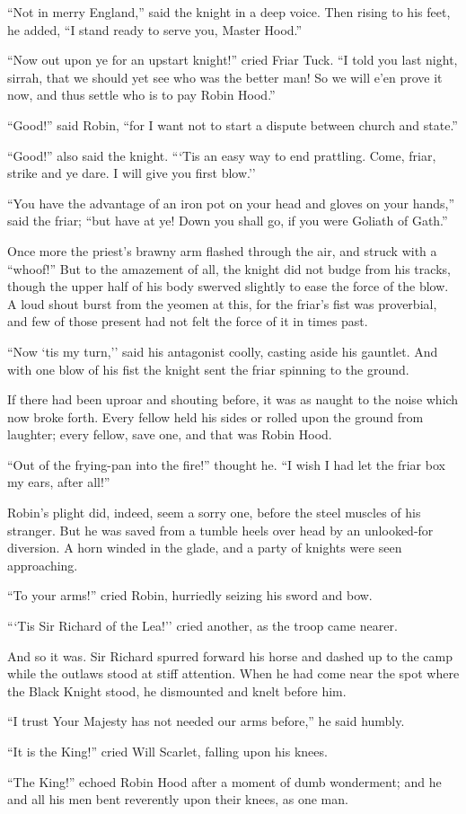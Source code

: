 ``Not in merry England,'' said the knight in a deep voice. Then rising
to his feet, he added, ``I stand ready to serve you, Master Hood.''

``Now out upon ye for an upstart knight!'' cried Friar Tuck. ``I told
you last night, sirrah, that we should yet see who was the better man!
So we will e'en prove it now, and thus settle who is to pay Robin
Hood.''

``Good!'' said Robin, ``for I want not to start a dispute between church
and state.''

``Good!'' also said the knight. ```Tis an easy way to end prattling.
Come, friar, strike and ye dare. I will give you first blow.''

``You have the advantage of an iron pot on your head and gloves on your
hands,'' said the friar; ``but have at ye! Down you shall go, if you
were Goliath of Gath.''

Once more the priest's brawny arm flashed through the air, and struck
with a ``whoof!'' But to the amazement of all, the knight did not budge
from his tracks, though the upper half of his body swerved slightly to
ease the force of the blow. A loud shout burst from the yeomen at this,
for the friar's fist was proverbial, and few of those present had not
felt the force of it in times past.

``Now `tis my turn,'' said his antagonist coolly, casting aside his
gauntlet. And with one blow of his fist the knight sent the friar
spinning to the ground.

If there had been uproar and shouting before, it was as naught to the
noise which now broke forth. Every fellow held his sides or rolled upon
the ground from laughter; every fellow, save one, and that was Robin
Hood.

``Out of the frying-pan into the fire!'' thought he. ``I wish I had let
the friar box my ears, after all!''

Robin's plight did, indeed, seem a sorry one, before the steel muscles
of his stranger. But he was saved from a tumble heels over head by an
unlooked-for diversion. A horn winded in the glade, and a party of
knights were seen approaching.

``To your arms!'' cried Robin, hurriedly seizing his sword and bow.

```Tis Sir Richard of the Lea!'' cried another, as the troop came
nearer.

And so it was. Sir Richard spurred forward his horse and dashed up to
the camp while the outlaws stood at stiff attention. When he had come
near the spot where the Black Knight stood, he dismounted and knelt
before him.

``I trust Your Majesty has not needed our arms before,'' he said humbly.

``It is the King!'' cried Will Scarlet, falling upon his knees.

``The King!'' echoed Robin Hood after a moment of dumb wonderment; and
he and all his men bent reverently upon their knees, as one man.
